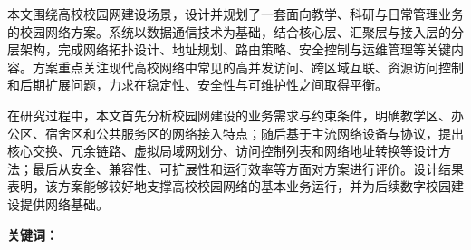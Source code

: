 
本文围绕高校校园网建设场景，设计并规划了一套面向教学、科研与日常管理业务的校园网络方案。系统以数据通信技术为基础，结合核心层、汇聚层与接入层的分层架构，完成网络拓扑设计、地址规划、路由策略、安全控制与运维管理等关键内容。方案重点关注现代高校网络中常见的高并发访问、跨区域互联、资源访问控制和后期扩展问题，力求在稳定性、安全性与可维护性之间取得平衡。

在研究过程中，本文首先分析校园网建设的业务需求与约束条件，明确教学区、办公区、宿舍区和公共服务区的网络接入特点；随后基于主流网络设备与协议，提出核心交换、冗余链路、虚拟局域网划分、访问控制列表和网络地址转换等设计方法；最后从安全、兼容性、可扩展性和运行效率等方面对方案进行评价。设计结果表明，该方案能够较好地支撑高校校园网络的基本业务运行，并为后续数字校园建设提供网络基础。

\vspace{0.6em}
\noindent\textbf{关键词：}\gccKeywordsZh

